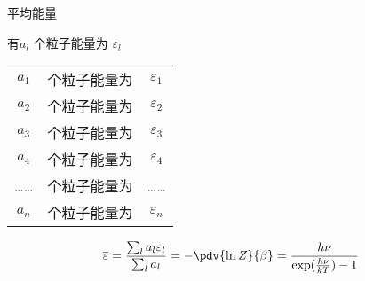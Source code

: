 平均能量

有\(a_l\) 个粒子能量为 \(\varepsilon_l\)
\begin{tabular}{ccc}
	\( a_1\) &   个粒子能量为 & \( \varepsilon_1\) \\
	\( a_2\) &   个粒子能量为 & \( \varepsilon_2\) \\
	\( a_3\) &   个粒子能量为 & \( \varepsilon_3\) \\
	\( a_4\) &   个粒子能量为 & \( \varepsilon_4\) \\
	…… & 个粒子能量为& …… \\
	\( a_n\) &   个粒子能量为 & \( \varepsilon_n\)
\end{tabular}
\begin{equation}
	\label{eq:planck_ave_energy}
	\overline{\varepsilon} = \frac{\sum_l a_l \varepsilon_l}{\sum_l a_l} = - \pdv{\ln Z}{\beta} = \frac{h \nu}{\exp(\frac{h\nu}{kT}) - 1}
\end{equation}





